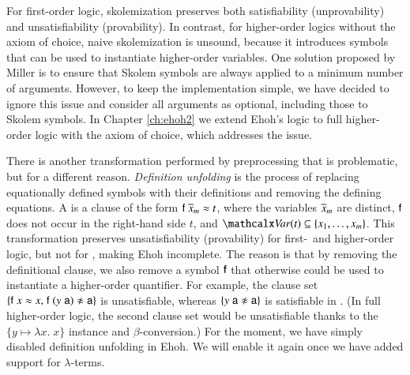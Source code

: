 \begin{rep}
For first-order logic, skolemization preserves both satisfiability
(unprovability) and unsatisfiability (provability). In contrast, for
higher-order logics without the axiom of choice, naive skolemization is
unsound, because it introduces symbols that can be used to instantiate
higher-order variables.
%
One solution proposed by Miller \cite[Sect.~6]{dm-87-compact-proofs} is to ensure that
Skolem symbols are always applied to a minimum number of arguments.
However, to keep the implementation simple, we have decided to
ignore this issue and consider all arguments as optional, including those to
Skolem symbols. In Chapter \ref{ch:ehoh2} we extend Ehoh's logic to full higher-order logic
with the axiom of choice, which addresses the issue.

There is another transformation performed by preprocessing that is
problematic, but for a different reason. \emph{Definition unfolding} is the
process of replacing equationally defined symbols with their definitions and
removing the defining equations. A  is a clause of the form
$\mathsf{f} \; \overline{x}_{m} \approx t$, where the variables $\overline{x}_{m}$ are distinct,
$\mathsf{f}$ does not occur in the right-hand side $t$, and $\Var(t) \subseteq
\{x_1,\dots,x_m\}$.
This transformation preserves unsatisfiability (provability) for first-~and
higher-order logic, but not for \lfhol{}, making Ehoh incomplete. The reason
is that by removing the definitional clause, we also remove a symbol $\mathsf{f}$
that otherwise could be used to instantiate a higher-order quantifier.
For example, the clause set
$\{\cst{f}\;x \eq x{,}\; \cst{f}\;(y\;\cst{a}) \noteq \cst{a}\}$ is unsatisfiable,
whereas $\{y\;\cst{a} \noteq \cst{a}\}$ is satisfiable in \lfhol{}. (In full
higher-order logic, the second clause set would be unsatisfiable thanks to
the $\{y \mapsto \lambda x.\; x\}$ instance and $\beta$-conversion.)
%
For the moment, we have simply disabled definition unfolding in Ehoh. We will
enable it again once we have added support for $\lambda$-terms.


\end{rep}

